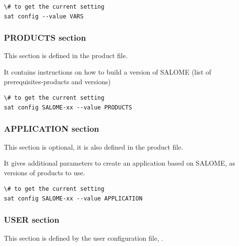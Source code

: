 \documentclass[a4paper,10pt,english]{sphinxmanual}
\begin{document}
\begin{Verbatim}[commandchars=\\\{\}]
\# to get the current setting
sat config --value VARS
\end{Verbatim}


\subsubsection{PRODUCTS section}
\label{configuration:products-section}
\begin{DUlineblock}{0em}
\item[] This section is defined in the product file.
\item[] It contains instructions on how to build a version of SALOME (list of prerequisites-products and versions)
\end{DUlineblock}

\begin{Verbatim}[commandchars=\\\{\}]
\# to get the current setting
sat config SALOME-xx --value PRODUCTS
\end{Verbatim}


\subsubsection{APPLICATION section}
\label{configuration:application-section}
\begin{DUlineblock}{0em}
\item[] This section is optional, it is also defined in the product file.
\item[] It gives additional parameters to create an application based on SALOME, as versions of products to use.
\end{DUlineblock}

\begin{Verbatim}[commandchars=\\\{\}]
\# to get the current setting
sat config SALOME-xx --value APPLICATION
\end{Verbatim}


\subsubsection{USER section}
\label{configuration:user-section}\label{configuration:id2}
This section is defined by the user configuration file,
.
\end{document}
